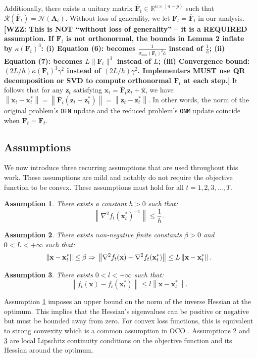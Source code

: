\documentclass[journal,twoside,web]{ieeecolor}
\newtheorem{assumption}{Assumption}
\newcommand{\norm}[1]{\left\lVert#1\right\rVert}
\newcommand{\xx}{\mathbf{x}}
\newcommand{\zz}{\mathbf{z}}
\renewcommand{\AA}{\mathbf{A}}
\newcommand{\FF}{\mathbf{F}}
\newcommand{\xh}{\mathbf{\hat{x}}}
\newcommand{\WZZ}[1]{{\color{red}\bf{[WZZ: #1]}}}
\begin{document}
Additionally, there exists a unitary matrix $\overline{\FF}_t\in\mathbb{R}^{n\times(n-p)}$ such that $\mathcal{R}\left(\overline{\FF}_t\right) = \mathcal{N}(\AA_t)$. Without loss of generality, we let $\FF_t=\overline{\FF}_t$ in our analysis.
\WZZ{This is NOT ``without loss of generality'' -- it is a REQUIRED assumption.
If $\FF_t$ is not orthonormal, the bounds in Lemma 2 inflate by $\kappa(\FF_t)^3$:
(i) Equation (6): becomes $\frac{1}{\sigma_{\min}(\FF_t)^2 h}$ instead of $\frac{1}{h}$;
(ii) Equation (7): becomes $L\|\FF_t\|^3$ instead of $L$;
(iii) Convergence bound: $(2L/h)\kappa(\FF_t)^3\gamma^2$ instead of $(2L/h)\gamma^2$.
Implementers MUST use QR decomposition or SVD to compute orthonormal $\FF_t$ at each step.}
It follows that for any $\zz_t$ satisfying $\xx_t = \overline{\FF}_t\zz_t+\xh$,
we have $\norm{\xx_t-\xx_t^*}=\norm{\overline{\FF}_t(\zz_t-\zz_t^*)}=\norm{\zz_t-\zz_t^*}$.
In other words, the norm of the original problem's \texttt{OEN} update and the reduced problem's \texttt{ONM} update coincide when $\FF_t=\overline{\FF}_t$. 

\subsection{Assumptions}
We now introduce three recurring assumptions that are used throughout this work. These assumptions are mild and notably do not require the objective function to be convex. {These assumptions must hold for all $t=1,2,3,...,T$.} 
\begin{assumption}
\label{ass:inv}
There exists a constant $h>0$ such that: \[\norm{\nabla^2f_t(\xx_t^*)^{-1}}\le\frac{1}{h}.\]
\end{assumption}
\begin{assumption}
\label{ass:lip}
There exists non-negative finite constants $\beta>0$ and $0<L<+\infty$ such that:
\[\norm{\xx - \xx_t^*} \le \beta \Rightarrow\\ \norm{\nabla^2 f_t(\xx)-\nabla^2 f_t(\xx_t^*)}\le L\norm{\xx-\xx_t^*}.\] 
\end{assumption}
\begin{assumption}
\label{ass:lip2}
There exists $0<l<+\infty$ such that:
\[\norm{f_t(\xx)-f_t(\xx^*_t)}\le l\norm{\xx-\xx^*_t}.\]
\end{assumption}

Assumption \ref{ass:inv} imposes an upper bound on the norm of the inverse Hessian at the optimum. This implies that the Hessian's eigenvalues can be positive or negative but must be bounded away from zero. {For convex loss functions, this is equivalent to strong convexity which is a common assumption in OCO \cite{Shalev, OnlineNewton, OnlineEpsilonProof}. } Assumptions \ref{ass:lip} and \ref{ass:lip2} are local Lipschitz continuity conditions on the objective function and its Hessian around the optimum.
\end{document}

